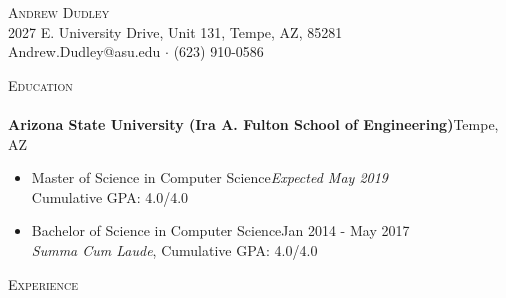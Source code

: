 \documentclass[a4paper]{article}
\newcommand{\lineunder} {
    \vspace*{-8pt} \\
    \hspace*{-18pt} \hrulefill \\
}
\newcommand{\header} [1] {
    {\hspace*{-18pt}\vspace*{6pt} \textsc{#1}}
    \vspace*{-6pt} \lineunder
}
\begin{document}
\vspace*{-40pt}

\vspace*{-10pt}
\begin{center}
	{\Huge \scshape {Andrew Dudley}}\\
    2027 E. University Drive, Unit 131, Tempe, AZ, 85281\\
    Andrew.Dudley@asu.edu $\cdot$ (623) 910-0586\\

\end{center}

\vspace*{1mm}

\header{Education}

\vspace{2mm}
\textbf{Arizona State University (Ira A. Fulton School of Engineering)}\hfill Tempe, AZ\\
    \begin{itemize}
        \item Master of Science in Computer Science\hfill \textit{Expected May 2019} \\
            Cumulative GPA: 4.0/4.0
        \item Bachelor of Science in Computer Science\hfill Jan 2014 - May 2017\\
            \textit{Summa Cum Laude}, Cumulative GPA: 4.0/4.0
    \end{itemize}

\header{Experience}
\vspace{1mm}
\end{document}
